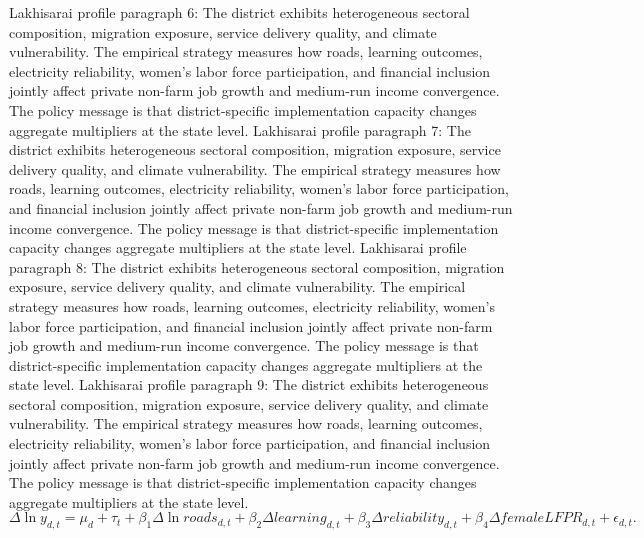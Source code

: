 \documentclass[preprint,12pt]{elsarticle}
\begin{document}
Lakhisarai profile paragraph 6: The district exhibits heterogeneous sectoral composition, migration exposure, service delivery quality, and climate vulnerability. The empirical strategy measures how roads, learning outcomes, electricity reliability, women's labor force participation, and financial inclusion jointly affect private non-farm job growth and medium-run income convergence. The policy message is that district-specific implementation capacity changes aggregate multipliers at the state level.
Lakhisarai profile paragraph 7: The district exhibits heterogeneous sectoral composition, migration exposure, service delivery quality, and climate vulnerability. The empirical strategy measures how roads, learning outcomes, electricity reliability, women's labor force participation, and financial inclusion jointly affect private non-farm job growth and medium-run income convergence. The policy message is that district-specific implementation capacity changes aggregate multipliers at the state level.
Lakhisarai profile paragraph 8: The district exhibits heterogeneous sectoral composition, migration exposure, service delivery quality, and climate vulnerability. The empirical strategy measures how roads, learning outcomes, electricity reliability, women's labor force participation, and financial inclusion jointly affect private non-farm job growth and medium-run income convergence. The policy message is that district-specific implementation capacity changes aggregate multipliers at the state level.
Lakhisarai profile paragraph 9: The district exhibits heterogeneous sectoral composition, migration exposure, service delivery quality, and climate vulnerability. The empirical strategy measures how roads, learning outcomes, electricity reliability, women's labor force participation, and financial inclusion jointly affect private non-farm job growth and medium-run income convergence. The policy message is that district-specific implementation capacity changes aggregate multipliers at the state level.
\begin{equation}\Delta \ln y_{d,t}=\mu_d+\tau_t+\beta_1\Delta\ln roads_{d,t}+\beta_2\Delta learning_{d,t}+\beta_3\Delta reliability_{d,t}+\beta_4\Delta femaleLFPR_{d,t}+\epsilon_{d,t}.\end{equation}
\end{document}
